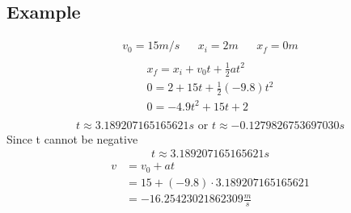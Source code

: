 \documentclass{article}
\theoremstyle{mytheoremstyle}
\theoremstyle{mytheoremstyle}
\theoremstyle{myproblemstyle}
\begin{document}
    \subsection*{Example}
    \begin{align*}
        v_0 = 15 m/s && x_i = 2m && x_f = 0m \\
    \end{align*}
    \begin{align*}
        x_f = x_i + v_0t + \frac{1}{2} at^2 \\
        0 = 2 + 15t + \frac{1}{2} (-9.8) t^2 \\
        0 = -4.9 t^2 + 15t + 2 \\
    \end{align*}
    \begin{align*}
        t \approx 3.189207165165621 s \text{ or } t \approx -0.1279826753697030 s
    \end{align*}
    Since t cannot be negative
    \begin{align*}
        t \approx 3.189207165165621 s
    \end{align*}
    \begin{align*}
        v &= v_0 + at \\
          &= 15 + (-9.8)\cdot 3.189207165165621 \\
          &= -16.25423021862309 \frac{m}{s}
    \end{align*}
\end{document}
